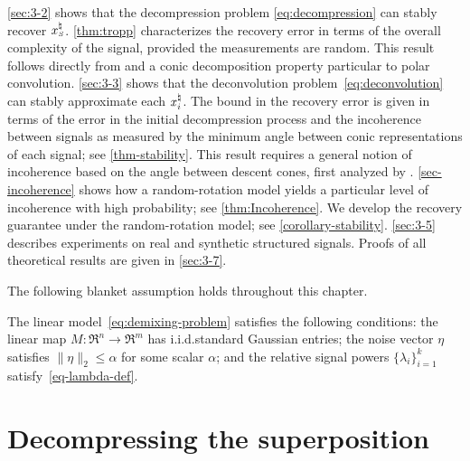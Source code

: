 \autoref{sec:3-2} shows that the decompression problem \eqref{eq:decompression} can stably recover $x_{\scriptscriptstyle S}^{\natural}$. \autoref{thm:tropp} characterizes the recovery error in terms of the overall complexity of the signal, provided the measurements are random. This result follows directly from \citet{tropp2015convex} and a conic decomposition property particular to polar convolution. \autoref{sec:3-3} shows that the deconvolution problem~\eqref{eq:deconvolution} can stably approximate each $x_i^{\natural}$. The bound in the recovery error is given in terms of the error in the initial decompression process and the incoherence between signals as measured by the minimum angle between conic representations of each signal; see \autoref{thm-stability}. This result requires a general notion of incoherence based on the angle between descent cones, first analyzed by \citet{mccoy2013achievable}.  \autoref{sec-incoherence} shows how a random-rotation model yields a particular level of incoherence with high probability; see \autoref{thm:Incoherence}. We develop the recovery guarantee under the random-rotation model; see \autoref{corollary-stability}. \autoref{sec:3-5} describes experiments on real and synthetic structured signals. Proofs of all theoretical results are given in \autoref{sec:3-7}.

The following blanket assumption holds throughout this chapter.
\begin{assumption}\label{assume-blanket}
  The linear model~\eqref{eq:demixing-problem} satisfies the following conditions: the linear map
  $M:\Re^n\to\Re^m$ has i.i.d.\@ standard Gaussian entries; the noise vector $\eta$ satisfies $\|\eta\|_2\leq \alpha$ for some scalar $\alpha$; and the relative signal powers $\{\lambda_i\}_{i=1}^k$ satisfy~\eqref{eq-lambda-def}.
\end{assumption} 


\section{Decompressing the superposition}\label{sec:3-2} 

